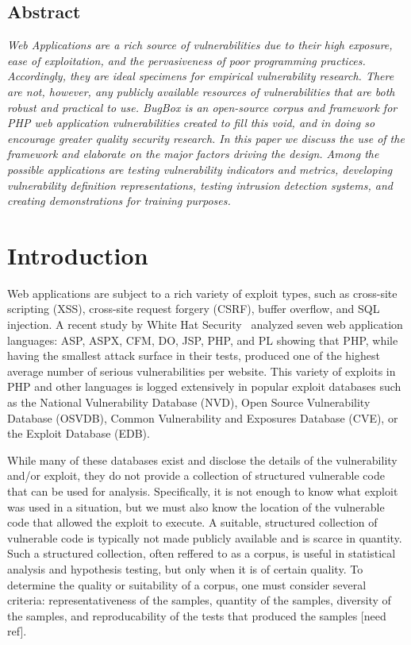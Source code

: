 \documentclass[letterpaper,twocolumn,10pt]{article}
\begin{document}


\subsection*{Abstract}
\textit{
Web Applications are a rich source of vulnerabilities due to their high exposure, ease of exploitation, and the pervasiveness of poor programming practices. Accordingly, they are ideal specimens for \emph{empirical vulnerability research}. There are not, however, any publicly available resources of vulnerabilities that are both robust and practical to use. BugBox is an open-source corpus and framework for PHP web application vulnerabilities created to fill this void, and in doing so encourage greater quality security research. In this paper we discuss the use of the framework and elaborate on the major factors driving the design. Among the possible applications are testing vulnerability indicators and metrics, developing vulnerability definition representations, testing intrusion detection systems, and creating demonstrations for training purposes.  
}

\section{Introduction}
Web applications are subject to a rich variety of exploit types, such as cross-site scripting (XSS), cross-site request forgery (CSRF), buffer overflow, and SQL injection.  A recent study by White Hat Security~\cite{WhiteHat:2010:Online} analyzed seven web application languages: ASP, ASPX, CFM, DO, JSP, PHP, and PL showing that PHP, while having the smallest attack surface in their tests, produced one of the highest average number of serious vulnerabilities per website.  This variety of exploits in PHP and other languages is logged extensively in popular exploit databases such as the National Vulnerability Database (NVD), Open Source Vulnerability Database (OSVDB), Common Vulnerability and Exposures Database (CVE), or the Exploit Database (EDB).\par

While many of these databases exist and disclose the details of the vulnerability and/or exploit, they do not provide a collection of structured vulnerable code that can be used for analysis.  Specifically, it is not enough to know what exploit was used in a situation, but we must also know the location of the vulnerable code that allowed the exploit to execute.  A suitable, structured collection of vulnerable code is typically not made publicly available and is scarce in quantity.  Such a structured collection, often reffered to as a corpus, is useful in statistical analysis and hypothesis testing, but only when it is of certain quality.  To determine the quality or suitability of a corpus, one must consider several criteria: representativeness of the samples, quantity of the samples, diversity of the samples, and reproducability of the tests that produced the samples [need ref].\par
\end{document}
